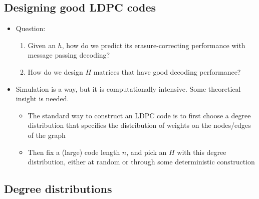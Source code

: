 \documentclass[12pt]{article}
\begin{document}
\subsection{Designing good LDPC codes}
\begin{itemize}
    \item Question:
    \begin{enumerate}
    \item Given an $h$, how do we predict its erasure-correcting performance with message passing decoding?
    \item How do we design $H$ matrices that have good decoding performance?
    \end{enumerate}
    \item Simulation is a way, but it is computationally intensive. Some theoretical insight is needed.
\begin{itemize}
    \item The standard way to construct an LDPC code is to first choose a degree distribution that specifies the distribution of weights on the nodes/edges of the graph
    \item Then fix a (large) code length $n$, and pick an $H$ with this degree distribution, either at random or through some deterministic construction
\end{itemize}
\end{itemize}

\subsection{Degree distributions}
\end{document}
